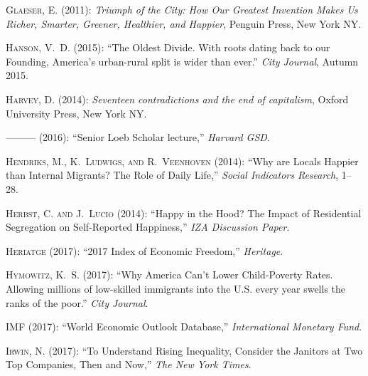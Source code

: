 \documentclass[10pt, letterpaper]{article}
\begin{document}
\begin{spacing}{2.0}
\begin{thebibliography}{115}
\textsc{Glaeser, E.} (2011): \emph{Triumph of the City: How Our Greatest
  Invention Makes Us Richer, Smarter, Greener, Healthier, and Happier}, Penguin
  Press, New York NY.

\textsc{Hanson, V.~D.} (2015): \enquote{The Oldest Divide. With roots dating
  back to our Founding, America's urban-rural split is wider than ever.}
  \emph{City Journal}, Autumn 2015.

\textsc{Harvey, D.} (2014): \emph{Seventeen contradictions and the end of
  capitalism}, Oxford University Press, New York NY.

---\hspace{-.1pt}---\hspace{-.1pt}--- (2016): \enquote{Senior Loeb Scholar
  lecture,} \emph{Harvard GSD}.

\textsc{Hendriks, M., K.~Ludwigs, and R.~Veenhoven} (2014): \enquote{Why are
  Locals Happier than Internal Migrants? The Role of Daily Life,} \emph{Social
  Indicators Research}, 1--28.

\textsc{Herbst, C. and J.~Lucio} (2014): \enquote{Happy in the Hood? The Impact
  of Residential Segregation on Self-Reported Happiness,} \emph{IZA Discussion
  Paper}.

\textsc{Heriatge} (2017): \enquote{2017 Index of Economic Freedom,}
  \emph{Heritage}.

\textsc{Hymowitz, K.~S.} (2017): \enquote{Why America Can't Lower Child-Poverty
  Rates. Allowing millions of low-skilled immigrants into the U.S. every year
  swells the ranks of the poor.} \emph{City Journal}.

\textsc{IMF} (2017): \enquote{World Economic Outlook Database,}
  \emph{International Monetary Fund}.

\textsc{Irwin, N.} (2017): \enquote{To Understand Rising Inequality, Consider
  the Janitors at Two Top Companies, Then and Now,} \emph{The New York Times}.


\end{thebibliography}
\end{spacing}
\end{document}
